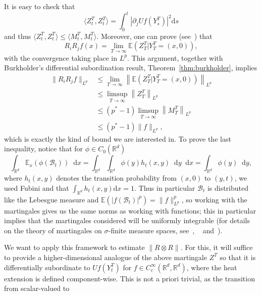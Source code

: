 \documentclass[11pt, a4paper]{amsart}
\theoremstyle{definition}
\theoremstyle{remark}
\newcommand{\R}{\mathbb{R}}
\newcommand*\diff{\mathop{}\!\mathrm{d}}
\begin{document}
It is easy to check that
\begin{equation*}
\langle Z^T_t, Z^T_t\rangle
=\int_0^t |\partial_j Uf(Y^T_s)|^2\mathrm{d}s
\end{equation*}
and thus $\langle Z^T_t,Z^T_t\rangle
\le \langle M^T_t,M^T_t\rangle$. Moreover, one can prove
(see~\cite[Theorem 3.9.1]{Banuelos}) that 
\begin{equation*}
R_i R_j f(x)=
\lim_{T\to \infty}\mathbb E\left(
Z^T_T|Y^T_T=(x,0)\right),
\end{equation*}
with the convergence taking place in $L^p$.
This argument, together with Burkholder's
differential subordination result,
Theorem~\ref{thm:burkholder},
implies
\begin{align*}
\|R_i R_j f\|_{L^p}&\le \lim_{T\to \infty}
\left\|\mathbb E\left(Z^T_T|Y^T_T=(x,0)\right)
\right\|_{L^p}
\\ &\le
\limsup_{T\to \infty}\left\|Z^T_T\right\|_{L^p}
\\ &\le
(p^*-1)\limsup_{T\to \infty}\left\|M_T^T\right\|_{L^p}
\\ &\le 
(p^*-1)\|f\|_{L^p},
\end{align*}
which is exactly the kind of bound we are interested in.
To prove the last inequality, notice that
for $\phi\in C_0(\R^d)$
\begin{equation*}
    \int_{\R^d}\mathbb E_x(\phi(\mathcal B_t))\diff x=
    \int_{\R^d}\int_{\R^d}\phi(y)h_t(x,y)\diff y\diff x
    =\int_{\R^d}\phi(y)\diff y,\end{equation*}
where $h_t(x,y)$ denotes the transition probability
from $(x,0)$ to $(y,t)$, we used Fubini
and that $\int_{\R^d}h_t(x,y)\mathrm{d}x=1$.
Thus in particular $\mathcal B_t$ is distributed like
the Lebesgue measure and $\mathbb 
E\left(|f(\mathcal B_t)|^p\right)=\|f\|_{L^p}^p$,
so working with the 
martingales gives us the same norms as working with 
functions; this in particular implies that
the martingales considered
will be uniformly integrable (for details on
the theory of martingales
on $\sigma$-finite measure spaces, 
see~\cite[Chapter 3]{analysisBS},
~\cite[sections 39-43]{dellacherie}
and~\cite[chapters 5-6]{Stroock}).\par
We want to apply this framework to estimate $\|R\otimes
R\|$. For this, it will suffice to provide a 
higher-dimensional analogue of the above
martingale $Z^T$ so that it
is differentially subordinate to
$Uf(Y_t^T)$ for $f\in C^\infty_c(\R^d,\R^d)$,
where the heat extension is defined component-wise.
This is not a priori trivial, 
as the transition from scalar-valued to
\end{document}
